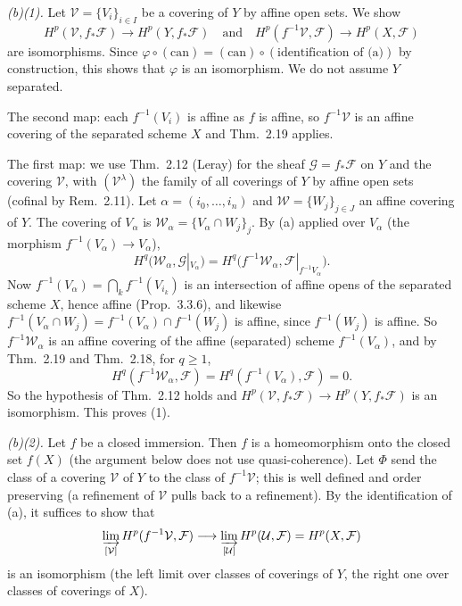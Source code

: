 \documentclass[11pt]{article}
\begin{document}
\emph{(b)(1).} Let $\mathcal V=\{V_i\}_{i\in I}$ be a covering of $Y$ by affine open sets. We show
\[ H^p(\mathcal V,f_*\mathcal F)\to H^p(Y,f_*\mathcal F)\quad\text{and}\quad H^p(f^{-1}\mathcal V,\mathcal F)\to H^p(X,\mathcal F) \]
are isomorphisms. Since $\varphi\circ(\text{can})=(\text{can})\circ(\text{identification of (a)})$ by construction, this shows that $\varphi$ is an isomorphism. We do not assume $Y$ separated.

The second map: each $f^{-1}(V_i)$ is affine as $f$ is affine, so $f^{-1}\mathcal V$ is an affine covering of the separated scheme $X$ and Thm.~2.19 applies.

The first map: we use Thm.~2.12 (Leray) for the sheaf $\mathcal G=f_*\mathcal F$ on $Y$ and the covering $\mathcal V$, with $(\mathcal V^\lambda)$ the family of all coverings of $Y$ by affine open sets (cofinal by Rem.~2.11). Let $\alpha=(i_0,\dots,i_n)$ and $\mathcal W=\{W_j\}_{j\in J}$ an affine covering of $Y$. The covering of $V_\alpha$ is $\mathcal W_\alpha=\{V_\alpha\cap W_j\}_j$. By (a) applied over $V_\alpha$ (the morphism $f^{-1}(V_\alpha)\to V_\alpha$),
\[ H^q(\mathcal W_\alpha,\mathcal G|_{V_\alpha})=H^q\bigl(f^{-1}\mathcal W_\alpha,\mathcal F|_{f^{-1}V_\alpha}\bigr). \]
Now $f^{-1}(V_\alpha)=\bigcap_kf^{-1}(V_{i_k})$ is an intersection of affine opens of the separated scheme $X$, hence affine (Prop.~3.3.6), and likewise $f^{-1}(V_\alpha\cap W_j)=f^{-1}(V_\alpha)\cap f^{-1}(W_j)$ is affine, since $f^{-1}(W_j)$ is affine. So $f^{-1}\mathcal W_\alpha$ is an affine covering of the affine (separated) scheme $f^{-1}(V_\alpha)$, and by Thm.~2.19 and Thm.~2.18, for $q\ge1$,
\[ H^q(f^{-1}\mathcal W_\alpha,\mathcal F)=H^q(f^{-1}(V_\alpha),\mathcal F)=0. \]
So the hypothesis of Thm.~2.12 holds and $H^p(\mathcal V,f_*\mathcal F)\to H^p(Y,f_*\mathcal F)$ is an isomorphism. This proves (1).

\emph{(b)(2).} Let $f$ be a closed immersion. Then $f$ is a homeomorphism onto the closed set $f(X)$ (the argument below does not use quasi-coherence). Let $\Phi$ send the class of a covering $\mathcal V$ of $Y$ to the class of $f^{-1}\mathcal V$; this is well defined and order preserving (a refinement of $\mathcal V$ pulls back to a refinement). By the identification of (a), it suffices to show that
\[ \varinjlim_{[\mathcal V]}H^p(f^{-1}\mathcal V,\mathcal F)\longrightarrow\varinjlim_{[\mathcal U]}H^p(\mathcal U,\mathcal F)=H^p(X,\mathcal F) \]
is an isomorphism (the left limit over classes of coverings of $Y$, the right one over classes of coverings of $X$).
\end{document}
